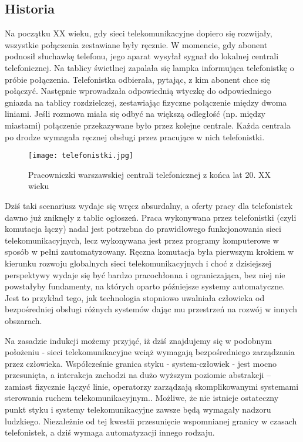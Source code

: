 \subsection{Historia}

Na początku XX wieku, gdy sieci telekomunikacyjne dopiero się rozwijały, wszystkie połączenia zestawiane były ręcznie. W momencie, gdy abonent podnosił słuchawkę telefonu, jego aparat wysyłał sygnał do lokalnej centrali telefonicznej. Na tablicy świetlnej zapalała się lampka informująca telefonistkę o próbie połączenia. Telefonistka odbierała, pytając, z kim abonent chce się połączyć. Następnie wprowadzała odpowiednią wtyczkę do odpowiedniego gniazda na tablicy rozdzielczej, zestawiając fizyczne połączenie między dwoma liniami. Jeśli rozmowa miała się odbyć na większą odległość (np. między miastami) połączenie przekazywane było przez kolejne centrale. Każda centrala po drodze wymagała ręcznej obsługi przez pracujące w nich telefonistki. 

\begin{figure}[!htbp]
    \centering \texttt{[image: telefonistki.jpg]}
    \caption{Pracowniczki warszawskiej centrali telefonicznej z końca lat 20. XX wieku}\label{fig:telefonistki}
\end{figure}

Dziś taki scenariusz wydaje się wręcz absurdalny, a oferty pracy dla telefonistek dawno już zniknęły z tablic ogłoszeń. Praca wykonywana przez telefonistki (czyli komutacja łączy) nadal jest potrzebna do prawidłowego funkcjonowania sieci telekomunikacyjnych, lecz wykonywana jest przez programy komputerowe w sposób w pełni zautomatyzowany. Ręczna komutacja była pierwszym krokiem w kierunku rozwoju globalnych sieci telekomunikacyjnych i choć z dzisiejszej perspektywy wydaje się być bardzo pracochłonna i ograniczająca, bez niej nie powstałyby fundamenty, na których oparto późniejsze systemy automatyczne. Jest to przykład tego, jak technologia stopniowo uwalniała człowieka od bezpośredniej obsługi różnych systemów dając mu przestrzeń na rozwój w innych obszarach.

Na zasadzie indukcji możemy przyjąć, iż dziś znajdujemy się w podobnym położeniu - sieci telekomunikacyjne wciąż wymagają bezpośredniego zarządzania przez człowieka. Współcześnie granica styku - system-człowiek - jest mocno przesunięta, a interakcja zachodzi na dużo wyższym poziomie abstrakcji – zamiast fizycznie łączyć linie, operatorzy zarządzają skomplikowanymi systemami sterowania ruchem telekomunikacyjnym.. Możliwe, że nie istnieje ostateczny punkt styku i systemy telekomunikacyjne zawsze będą wymagały nadzoru ludzkiego. Niezależnie od tej kwestii przesunięcie wspomnianej granicy w czasach telefonistek, a dziś wymaga automatyzacji innego rodzaju. 

